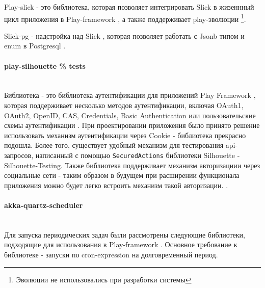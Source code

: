 \documentclass[a4paper,12pt]{article}
\begin{document}
	Play-slick - это библиотека, которая позволяет интегрировать Slick \cite{slick} в жизеннный цикл приложения в Play-framework \cite{play}, а также поддерживает play-эволюции \footnote{Эволюции не использовались при разработки системы}.
	
	Slick-pg - надстройка над Slick \cite{slick}, которая позволяет работать с Jsonb типом и enum в Postgresql \cite{postgresql}.
	
	\paragraph{play-silhouette \% tests\\ \\}
	Библиотека  - это библиотека аутентификации для приложений Play Framework \cite{play}, которая поддерживает несколько методов аутентификации, включая OAuth1, OAuth2, OpenID, CAS, Credentials, Basic Authentication или пользовательские схемы аутентификации \cite{silhouette}. При проектировании приложения было принято решение использовать механизм аутентификации через Cookie - библиотека прекрасно подошла. Более того, существует удобный механизм для тестирования api-запросов, написанный с помощью \texttt{SecuredActions} библиотеки Silhouette - Silhouette-Testing. Также библиотека поддерживает механизм авторизациии через социальные сети - таким образом в будущем при расширении функционала приложения можно будет легко встроить механизм такой авторизации. \cite{silhouette-testing}. 
	
	\paragraph{akka-quartz-scheduler\\ \\}
	
	Для запуска периодических задач были рассмотрены следующие библиотеки, подходящие для использования в Play-framework \cite{play}. Основное требование к библиотеке - запуски по cron-expression на долговременный период.
	
\end{document}
